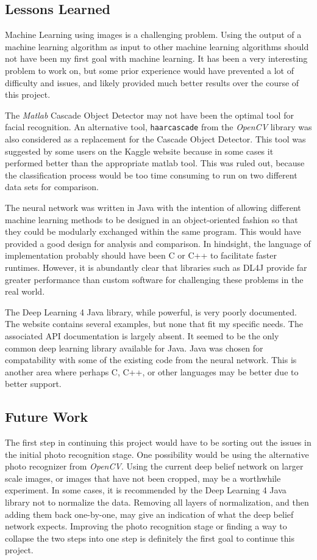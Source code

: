 \documentclass[10pt]{IEEEtran}
\newcommand{\?}{\stackrel{?}{=}}
\begin{document}
\subsection{Lessons Learned}
Machine Learning using images is a challenging problem. Using the output of 
a machine learning algorithm as input to other machine learning algorithms should
not have been my first goal with machine learning. It has been a very interesting
problem to work on, but some prior experience would have prevented a lot of 
difficulty and issues, and likely provided much better results over the course 
of this project.

The \textit{Matlab} Cascade Object Detector may not have been the optimal
tool for facial recognition. An alternative tool, \texttt{haarcascade} from the 
\textit{OpenCV} library was also considered as a replacement for the Cascade 
Object Detector\cite{haar}. This tool was suggested by some users on the Kaggle 
website because in some cases it performed better than the appropriate matlab 
tool\cite{kforums}. This was ruled out, because the classification process 
would be too time consuming to run on two different data sets for comparison.

The neural network was written in Java with the intention of allowing different 
machine learning methods to be designed in an object-oriented fashion so that 
they could be modularly exchanged within the same program. This would have 
provided a good design for analysis and comparison.
In hindsight, the language of implementation probably should have been C or 
C++ to facilitate faster runtimes. However, it is abundantly clear that libraries
such as DL4J provide far greater performance than custom software for
challenging these problems in the real world\cite{scaleout}.

The Deep Learning 4 Java library, while powerful, is very poorly documented. 
The website contains several examples, but none that fit my specific needs.
The associated API documentation is largely absent. It
seemed to be the only common deep learning library available for Java. Java
was chosen for compatability with some of the existing code from the neural network.
This is another area where perhaps C, C++, or other languages may be better 
due to better support.

\subsection{Future Work}
The first step in continuing this project would have to be sorting out the 
issues in the initial photo recognition stage. One possibility would be using
the alternative photo recognizer from \textit{OpenCV}\cite{haar}.
Using the current deep belief network on larger 
scale images, or images that have not been cropped, may be a worthwhile experiment.
In some cases, it is recommended by the Deep Learning 4 Java library not to 
normalize the data\cite{face}. Removing all layers of normalization, and then
adding them back one-by-one, may give an indication of what the
deep belief network expects. Improving the photo recognition stage or finding
a way to collapse the two steps into one step is definitely the 
first goal to continue this project.
\end{document}

